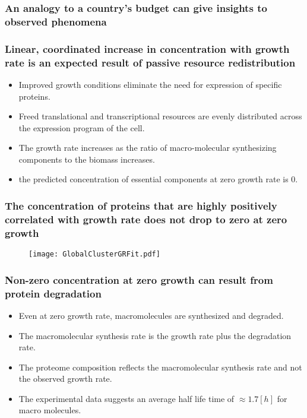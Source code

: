 \documentclass{beamer}
\begin{document}
\begin{frame}
\frametitle{An analogy to a country's budget can give insights to observed phenomena}
\end{frame}


\begin{frame}
\frametitle{Linear, coordinated increase in concentration with growth rate is an expected result of passive resource redistribution}
\begin{itemize}[<+->]
\item Improved growth conditions eliminate the need for expression of specific proteins.
\item Freed translational and transcriptional resources are evenly distributed across the expression program of the cell.
\item The growth rate increases as the ratio of macro-molecular synthesizing components to the biomass increases.
\item the predicted concentration of essential components at zero growth rate is 0.
\end{itemize}
\end{frame}
\begin{frame}
\frametitle{The concentration of proteins that are highly positively correlated with growth rate does not drop to zero at zero growth}
\begin{figure}[h!]
\centering
\texttt{[image: GlobalClusterGRFit.pdf]}
\end{figure}
\end{frame}
\begin{frame}
\frametitle{Non-zero concentration at zero growth can result from protein degradation}
\begin{itemize}[<+->]
\item Even at zero growth rate, macromolecules are synthesized and degraded.
\item The macromolecular synthesis rate is the growth rate plus the degradation rate.
\item The proteome composition reflects the macromolecular synthesis rate and not the observed growth rate.
\item The experimental data suggests an average half life time of $\approx 1.7[h]$ for macro molecules.
\end{itemize}
\end{frame}
\end{document}
